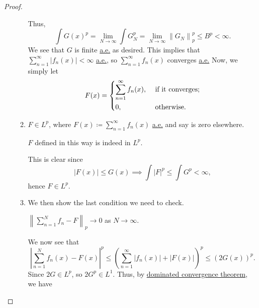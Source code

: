 \begin{proof}
\begin{itemize}
\begin{enumerate}
\begin{explanation}
\[				            \]
				            Thus,
				            \[
					            \int G(x)^p = \lim\limits_{N \to \infty} \int G^p_N = \lim\limits_{N \to \infty} \left\lVert G_{N} \right\rVert ^p_p \leq B^{p} < \infty .
				            \]
				            We see that \(G\) is finite \hyperref[def:mu-almost-everywhere]{a.e.} as desired. This implies that \(\sum\limits_{n=1}^{\infty }\left\vert f_{n} (x) \right\vert  < \infty \)
				            \hyperref[def:mu-almost-everywhere]{a.e.}, so \(\sum\limits_{n=1}^{\infty }f_{n} (x) \) converges \hyperref[def:mu-almost-everywhere]{a.e.} Now, we simply let
				            \[
					            F(x) = \begin{dcases}
						            \sum\limits_{n=1}^{\infty} f_{n} (x), & \text{ if it converges}  ; \\
						            0,                                    & \text{ otherwise}.
					            \end{dcases}
				            \]
			            \end{explanation}
			      \item \(F\in L^p\), where \(F(x)\coloneqq \sum\limits_{n=1}^{\infty}f_{n} (x) \) \hyperref[def:mu-almost-everywhere]{a.e.} and say is zero elsewhere.
			            \begin{claim}
				            \(F\) defined in this way is indeed in \(L^p\).
			            \end{claim}
			            \begin{explanation}
				            This is clear since
				            \[
					            \left\vert F(x) \right\vert \leq G(x) \implies \int \left\vert F \right\vert ^p \leq \int G^p < \infty ,
				            \]
				            hence \(F\in L^p\).
			            \end{explanation}
			      \item We then show the last condition we need to check.
			            \begin{claim}
				            \(\left\lVert \sum\limits_{n=1}^{N} f_{n} -F\right\rVert_p \to 0\) as \(N\to \infty \).
			            \end{claim}
			            \begin{explanation}
				            We now see that
				            \[
					            \left\vert \sum\limits_{n=1}^{N} f_{n} (x) - F(x) \right\vert ^p \leq \left(\sum\limits_{n=1}^{\infty} \left\vert f_{n} (x) \right\vert + \left\vert F(x) \right\vert \right)^p \leq (2G(x))^p.
				            \]
				            Since \(2G\in L^p\), so \(2G^p\in L^1\). Thus, by \hyperref[thm:dominated-convergence-theorem]{dominated convergence theorem}, we have

\end{explanation}
\end{enumerate}
\end{itemize}
\end{proof}

